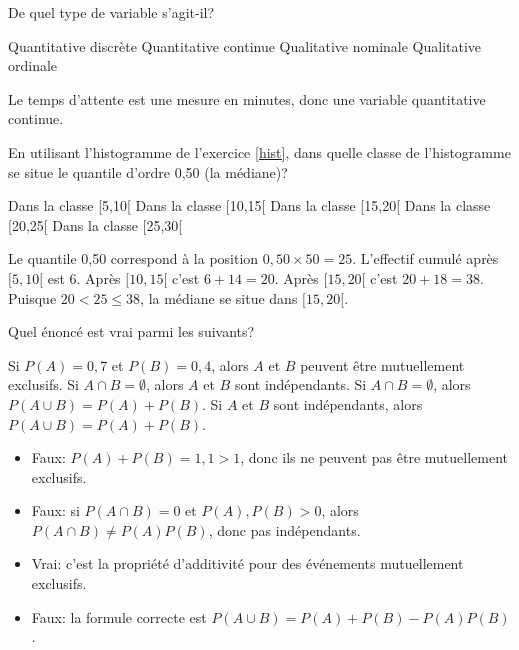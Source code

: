 \begin{questions}
De quel type de variable s'agit-il? 
 

	
\begin{checkboxes}
        \choice Quantitative discrète
        \correctchoice Quantitative continue
        \choice Qualitative nominale
        \choice Qualitative ordinale
	\end{checkboxes}

\begin{solution}
Le temps d'attente est une mesure en minutes, donc une variable quantitative continue.
\end{solution}


\question[3] En utilisant l'histogramme de l'exercice \ref{hist}, dans quelle classe de l'histogramme se situe le quantile d'ordre 0,50 (la médiane)?

	\begin{checkboxes}
        \choice Dans la classe [5,10[
        \choice Dans la classe [10,15[
        \correctchoice Dans la classe [15,20[
        \choice Dans la classe [20,25[
        \choice Dans la classe [25,30[
	\end{checkboxes}

\begin{solution}
Le quantile 0,50 correspond à la position $0{,}50\times 50=25$. L'effectif cumulé après $[5,10[$ est $6$. Après $[10,15[$ c'est $6+14=20$. Après $[15,20[$ c'est $20+18=38$. Puisque $20<25\leq 38$, la médiane se situe dans $[15,20[$.
\end{solution}


\question[3] Quel énoncé est vrai parmi les suivants?

\begin{checkboxes}
    \choice Si $P(A)=0{,}7$ et $P(B)=0{,}4$, alors $A$ et $B$ peuvent être mutuellement exclusifs.
    \choice Si $A \cap B = \emptyset$, alors $A$ et $B$ sont indépendants.
    \correctchoice Si $A \cap B = \emptyset$, alors $P(A \cup B)=P(A)+P(B)$.
    \choice Si $A$ et $B$ sont indépendants, alors $P(A \cup B) = P(A) + P(B)$.
\end{checkboxes}

\begin{solution}
\begin{itemize}
    \item Faux: $P(A)+P(B)=1{,}1>1$, donc ils ne peuvent pas être mutuellement exclusifs.
    \item Faux: si $P(A\cap B)=0$ et $P(A),P(B)>0$, alors $P(A\cap B)\neq P(A)P(B)$, donc pas indépendants.
    \item Vrai: c'est la propriété d'additivité pour des événements mutuellement exclusifs.
    \item Faux: la formule correcte est $P(A\cup B)=P(A)+P(B)-P(A)P(B)$.
\end{itemize}
\end{solution}


\end{questions}

